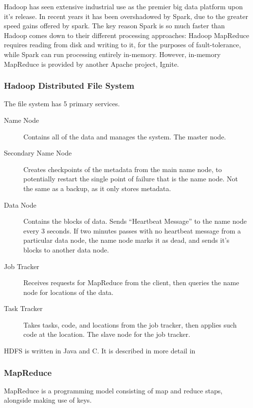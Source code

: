\documentclass[a4paper,10pt]{article}
\begin{document}
Hadoop has seen extensive industrial use as the premier big data
platform upon it's release. In recent years it has been overshadowed
by Spark, due to the greater speed gains offered by spark. The key
reason Spark is so much faster than Hadoop comes down to their
different processing approaches: Hadoop MapReduce requires reading
from disk and writing to it, for the purposes of fault-tolerance,
while Spark can run processing entirely in-memory. However, in-memory
MapReduce is provided by another Apache project,
Ignite\cite{zheludkov2017high}.

\subsubsection{Hadoop Distributed File System}
\label{sec:hdfs}

The file system has 5 primary services.

\begin{description}
	\item[Name Node] Contains all of the data and manages the system. The
	      master node.
	\item[Secondary Name Node] Creates checkpoints of the metadata from
	      the main name node, to potentially restart the single point of
	      failure that is the name node. Not the same as a backup, as it only
	      stores metadata.
	\item[Data Node] Contains the blocks of data. Sends ``Heartbeat
	      Message'' to the name node every 3 seconds. If two minutes passes
	      with no heartbeat message from a particular data node, the name node
	      marks it as dead, and sends it's blocks to another data node.
	\item[Job Tracker] Receives requests for MapReduce from the client,
	      then queries the name node for locations of the data.
	\item[Task Tracker] Takes tasks, code, and locations from the job
	      tracker, then applies such code at the location. The slave node for
	      the job tracker.
\end{description}

HDFS is written in Java and C. It is described in more detail in
\textcite{shvachko2010hadoop}

\subsubsection{MapReduce}
\label{sec:mapreduce}

MapReduce is a programming model consisting of map and reduce staps,
alongside making use of keys.
\end{document}
